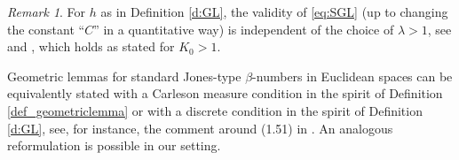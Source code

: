 \documentclass[12pt]{amsart}
\numberwithin{equation}{section}
\theoremstyle{plain}
\theoremstyle{definition}
\theoremstyle{remark}
\newtheorem{remark}[theorem]{Remark}
\begin{document}
 \begin{remark}\label{r_independenceoflambda}
  For $h$ as in Definition \ref{d:GL}, the validity of \eqref{eq:SGL} (up to changing the constant ``$C$'' in a quantitative way) is independent of the choice of $\lambda>1$, see \cite[Remark 2.30]{FV1} and \cite[Lemma 2.23]{FV1}, which holds as stated for $K_0 >1$.
\end{remark}

Geometric lemmas for standard Jones-type $\beta$-numbers in Euclidean spaces can be equivalently stated with a Carleson measure condition in the spirit of Definition \ref{def_geometriclemma} or with a discrete condition in the spirit of Definition \ref{d:GL}, see, for instance, the comment around (1.51) in  \cite[p.20]{David2}. An analogous reformulation is possible in our setting. 
\end{document}
